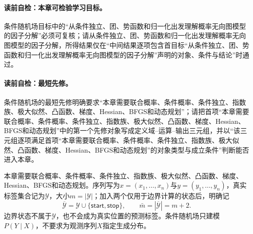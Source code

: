 \paragraph{读前自检：本章可检验学习目标。}条件随机场目标中的“从条件独立、团、势函数和归一化出发理解概率无向图模型的因子分解”必须可复核；请从条件独立、团、势函数和归一化出发理解概率无向图模型的因子分解，所得结果仅在“中间结果逐项包含首目标“从条件独立、团、势函数和归一化出发理解概率无向图模型的因子分解”声明的对象、条件与结论”时通过。\par


\label{struct:V3-C06-CH02}
\paragraph{读前自检：最短先修。}条件随机场的最短先修明确要求“本章需要联合概率、条件概率、条件独立、指数族、极大似然、凸函数、梯度、Hessian、BFGS和动态规划”；请把首项“本章需要联合概率、条件概率、条件独立、指数族、极大似然、凸函数、梯度、Hessian、BFGS和动态规划”中的第一个先修对象写成定义域--运算--输出三元组，并以“该三元组逐项满足首项“本章需要联合概率、条件概率、条件独立、指数族、极大似然、凸函数、梯度、Hessian、BFGS和动态规划”的对象类型与成立条件”判断能否进入本章。\par

\begin{prerequisitebox}
本章需要联合概率、条件概率、条件独立、指数族、极大似然、凸函数、梯度、Hessian、BFGS和动态规划。序列写为$x=(x_1,\ldots,x_n)$与$y=(y_1,\ldots,y_n)$，真实标签集合记为$\mathcal Y$，大小$m=|\mathcal Y|$；加入两个仅用于边界计算的状态后，明确记
\[
\overline{\mathcal Y}=\mathcal Y\cup\{\mathsf{start},\mathsf{stop}\},
\qquad
\bar m=|\overline{\mathcal Y}|=m+2.
\]
边界状态不属于$\mathcal Y$，也不会成为真实位置的预测标签。条件随机场只建模$P(Y\mid X)$，不要求为观测序列$X$指定生成分布。
\end{prerequisitebox}

